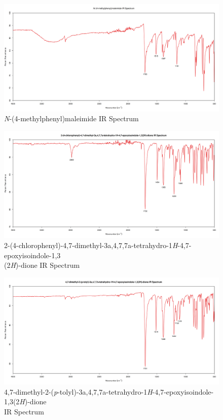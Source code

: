 \documentclass[11pt]{article}
\begin{document}
\begin{figure}[H]
    \centering
    \includegraphics[scale=0.33]{spectra/ir10.2.png}
    \caption{\textit{N}-(4-methylphenyl)maleimide IR Spectrum}
\end{figure}
\begin{figure}[H]
    \centering
    \includegraphics[scale=0.33]{spectra/ir9.3.png}
    \caption{2-(4-chlorophenyl)-4,7-dimethyl-3a,4,7,7a-tetrahydro-1\textit{H}-4,7-epoxyisoindole-1,3\\(2\textit{H})-dione IR Spectrum}
\end{figure}
\begin{figure}[H]
    \centering
    \includegraphics[scale=0.33]{spectra/ir10.3.png}
    \caption{4,7-dimethyl-2-(\textit{p}-tolyl)-3a,4,7,7a-tetrahydro-1\textit{H}-4,7-epoxyisoindole-1,3(2\textit{H})-dione \\ IR Spectrum}
\end{figure}
\end{document}

